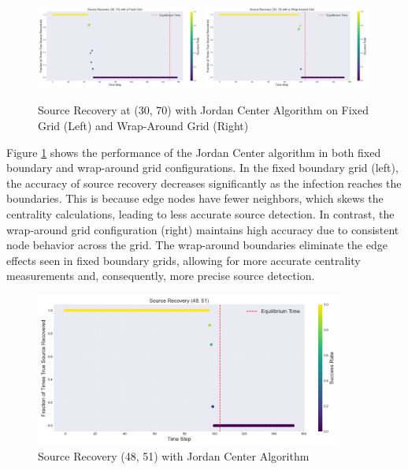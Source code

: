 \begin{figure}[H]
\centering
\includegraphics[width=0.49\textwidth]{source_recovery_30_70_Fixed_Grid.png}
\includegraphics[width=0.49\textwidth]{source_recovery_30_70_Wrap_Around_Grid.png}
\caption{Source Recovery at (30, 70) with Jordan Center Algorithm on Fixed Grid (Left) and Wrap-Around Grid (Right)}
\label{handling_boundaries_jordan_center}
\end{figure}

Figure \ref{handling_boundaries_jordan_center} shows the performance of the Jordan Center algorithm in both fixed boundary and wrap-around grid configurations. In the fixed boundary grid (left), the accuracy of source recovery decreases significantly as the infection reaches the boundaries. This is because edge nodes have fewer neighbors, which skews the centrality calculations, leading to less accurate source detection. In contrast, the wrap-around grid configuration (right) maintains high accuracy due to consistent node behavior across the grid. The wrap-around boundaries eliminate the edge effects seen in fixed boundary grids, allowing for more accurate centrality measurements and, consequently, more precise source detection.

\begin{figure}[H]
\centering
\includegraphics[width=0.9\textwidth]{source_recovery_48_51.png}
\caption{Source Recovery (48, 51) with Jordan Center Algorithm}
\label{source_recovery_central_node_jordan_center}
\end{figure}

